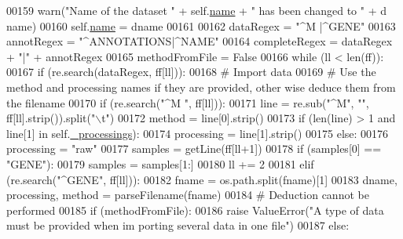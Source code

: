 \begin{DoxyCode}
00159             warn(\textcolor{stringliteral}{"Name of the dataset "} + self.\hyperlink{classnavicom_1_1navicom_1_1NaviCom_a950e5ebf199edea40d55c506b8aaf134}{name} + \textcolor{stringliteral}{" has been changed to "} + d
      name)
00160         self.\hyperlink{classnavicom_1_1navicom_1_1NaviCom_a950e5ebf199edea40d55c506b8aaf134}{name} = dname
00161 
00162         dataRegex = \textcolor{stringliteral}{"^M |^GENE"}
00163         annotRegex = \textcolor{stringliteral}{"^ANNOTATIONS|^NAME"}
00164         completeRegex = dataRegex + \textcolor{stringliteral}{"|"} + annotRegex
00165         methodFromFile = \textcolor{keyword}{False}
00166         \textcolor{keywordflow}{while} (ll < len(ff)):
00167             \textcolor{keywordflow}{if} (re.search(dataRegex, ff[ll])):
00168                 \textcolor{comment}{# Import data}
00169                 \textcolor{comment}{# Use the method and processing names if they are provided, other
      wise deduce them from the filename }
00170                 \textcolor{keywordflow}{if} (re.search(\textcolor{stringliteral}{"^M "}, ff[ll])):
00171                     line = re.sub(\textcolor{stringliteral}{"^M"}, \textcolor{stringliteral}{""}, ff[ll].strip()).split(\textcolor{stringliteral}{"\(\backslash\)t"})
00172                     method = line[0].strip()
00173                     \textcolor{keywordflow}{if} (len(line) > 1 \textcolor{keywordflow}{and} line[1] \textcolor{keywordflow}{in} self.\hyperlink{classnavicom_1_1navicom_1_1NaviCom_ac6a14d6a91cd2f236eef71496a6f249c}{_processings}):
00174                         processing = line[1].strip()
00175                     \textcolor{keywordflow}{else}:
00176                         processing = \textcolor{stringliteral}{"raw"}
00177                     samples = getLine(ff[ll+1])
00178                     \textcolor{keywordflow}{if} (samples[0] == \textcolor{stringliteral}{"GENE"}):
00179                         samples = samples[1:]
00180                     ll += 2
00181                 \textcolor{keywordflow}{elif} (re.search(\textcolor{stringliteral}{"^GENE"}, ff[ll])):
00182                     fname = os.path.split(fname)[1]
00183                     dname, processing, method = parseFilename(fname)
00184                     \textcolor{comment}{# Deduction cannot be performed}
00185                     \textcolor{keywordflow}{if} (methodFromFile):
00186                         \textcolor{keywordflow}{raise} ValueError(\textcolor{stringliteral}{"A type of data must be provided when im
      porting several data in one file"})
00187                     \textcolor{keywordflow}{else}:

\end{DoxyCode}
